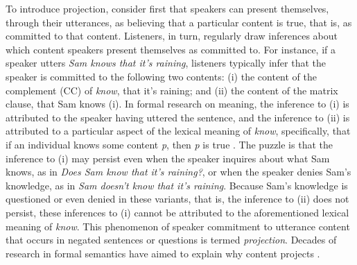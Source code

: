 \documentclass[OpenMind]{stjour}
\begin{document}
To introduce projection, consider first that speakers can present themselves, through their utterances, as believing that a particular content is true, that is, as committed to that content. Listeners, in turn, regularly draw inferences about which content speakers present themselves as committed to.  For instance, if a speaker utters \emph{Sam knows that it's raining}, listeners typically infer that the speaker is committed to the following two contents: (i) the content of the complement (CC) of {\em know},  that it's raining; and (ii) the content of the matrix clause, that Sam knows (i). In formal research on meaning, the inference to (i) is attributed to the speaker having uttered the sentence, and the inference to (ii) is attributed to a particular aspect of the lexical meaning of {\em know}, specifically, that if an individual knows some content {\em p}, then {\em p} is true \citep[e.g.,][]{ccmg90}. The puzzle is that the inference to (i) may persist even when the speaker inquires about what Sam knows, as in {\em Does Sam know that it's raining?}, or when the speaker denies Sam's knowledge, as in {\em Sam doesn't know that it's raining}. Because Sam's knowledge is questioned or even denied in these variants, that is, the inference to (ii) does not persist, these inferences to (i) cannot be attributed to the aforementioned lexical meaning of {\em know}. This phenomenon of speaker commitment to utterance content that occurs in negated sentences or questions is termed \emph{projection}. Decades of research in formal semantics have aimed to explain why content projects \citep[e.g.,][]{langendoen-savin71,beaver-geurts-sep}.
\end{document}
